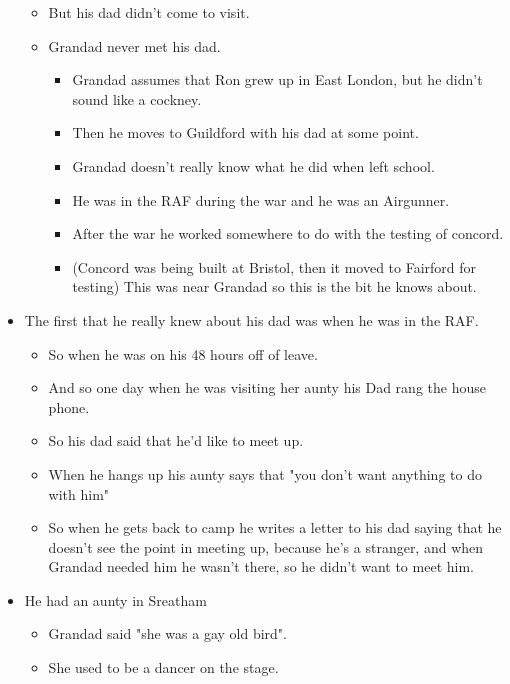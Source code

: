 \documentclass[10pt,twocolumn,letterpaper]{article}
\begin{document}
\begin{itemize}
\begin{itemize}
              \item But his dad didn't come to visit.
              \item Grandad never met his dad.
                    \begin{itemize}
                        \item Grandad assumes that Ron grew up in East London, but he didn't sound like a cockney.
                        \item Then he moves to Guildford with his dad at some point.
                        \item Grandad doesn't really know what he did when left school.
                        \item He was in the RAF during the war and he was an Airgunner.
                        \item After the war he worked somewhere to do with the testing of concord.
                        \item (Concord was being built at Bristol, then it moved to Fairford for testing) This was near Grandad so this is the bit he knows about.
                    \end{itemize}
          \end{itemize}
    \item The first that he really knew about his dad was when he was in the RAF.
          \begin{itemize}
              \item So when he was on his 48 hours off of leave.
              \item And so one day when he was visiting her aunty his Dad rang the house phone.
              \item So his dad said that he'd like to meet up.
              \item When he hangs up his aunty says that "you don't want anything to do with him"
              \item So when he gets back to camp he writes a letter to his dad saying that he doesn't see the point in meeting up, because he's a  stranger, and when Grandad needed him he wasn't there, so he didn't want to meet him.
          \end{itemize}
    \item He had an aunty in Sreatham
          \begin{itemize}
              \item Grandad said "she was a gay old bird".
              \item She used to be a dancer on the stage.

\end{itemize}
\end{itemize}
\end{document}
